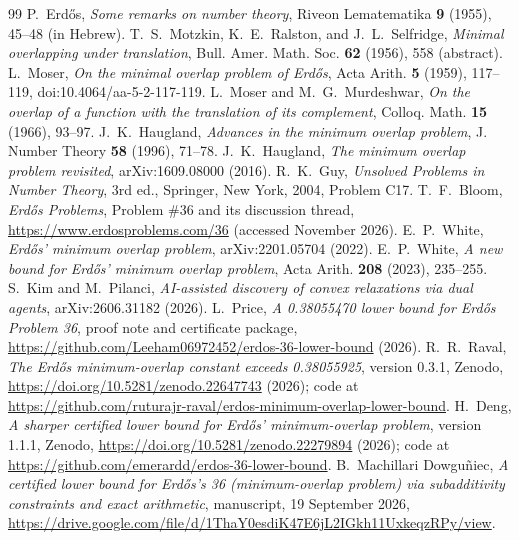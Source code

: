 \documentclass[11pt,a4paper]{article}
\theoremstyle{definition}
\theoremstyle{remark}
\begin{document}
\begin{thebibliography}{99}\sloppy
{} P.~Erd\H{o}s, \emph{Some remarks on number theory}, Riveon Lematematika \textbf{9} (1955), 45--48 (in Hebrew).
 T.~S.~Motzkin, K.~E.~Ralston, and J.~L.~Selfridge, \emph{Minimal overlapping under translation}, Bull. Amer. Math. Soc. \textbf{62} (1956), 558 (abstract).
 L.~Moser, \emph{On the minimal overlap problem of Erd\H{o}s}, Acta Arith. \textbf{5} (1959), 117--119, doi:10.4064/aa-5-2-117-119.
 L.~Moser and M.~G.~Murdeshwar, \emph{On the overlap of a function with the translation of its complement}, Colloq. Math. \textbf{15} (1966), 93--97.
 J.~K.~Haugland, \emph{Advances in the minimum overlap problem}, J. Number Theory \textbf{58} (1996), 71--78.
 J.~K.~Haugland, \emph{The minimum overlap problem revisited}, arXiv:1609.08000 (2016).
 R.~K.~Guy, \emph{Unsolved Problems in Number Theory}, 3rd ed., Springer, New York, 2004, Problem C17.
 T.~F.~Bloom, \emph{Erd\H{o}s Problems}, Problem \#36 and its discussion thread, \url{https://www.erdosproblems.com/36} (accessed November 2026).
 E.~P.~White, \emph{Erd\H{o}s' minimum overlap problem}, arXiv:2201.05704 (2022).
 E.~P.~White, \emph{A new bound for Erd\H{o}s' minimum overlap problem}, Acta Arith. \textbf{208} (2023), 235--255.
 S.~Kim and M.~Pilanci, \emph{AI-assisted discovery of convex relaxations via dual agents}, arXiv:2606.31182 (2026).
 L.~Price, \emph{A 0.38055470 lower bound for Erd\H{o}s Problem 36}, proof note and certificate package, \url{https://github.com/Leeham06972452/erdos-36-lower-bound} (2026).
 R.~R.~Raval, \emph{The Erd\H{o}s minimum-overlap constant exceeds 0.38055925}, version 0.3.1, Zenodo, \url{https://doi.org/10.5281/zenodo.22647743} (2026); code at \url{https://github.com/ruturajr-raval/erdos-minimum-overlap-lower-bound}.
 H.~Deng, \emph{A sharper certified lower bound for Erd\H{o}s' minimum-overlap problem}, version 1.1.1, Zenodo, \url{https://doi.org/10.5281/zenodo.22279894} (2026); code at \url{https://github.com/emerardd/erdos-36-lower-bound}.
 B.~Machillari Dowgu\~{n}iec, \emph{A certified lower bound for Erd\H{o}s's 36 (minimum-overlap problem) via subadditivity constraints and exact arithmetic}, manuscript, 19 September 2026, \url{https://drive.google.com/file/d/1ThaY0esdiK47E6jL2IGkh11UxkeqzRPy/view}.

\end{thebibliography}
\end{document}
